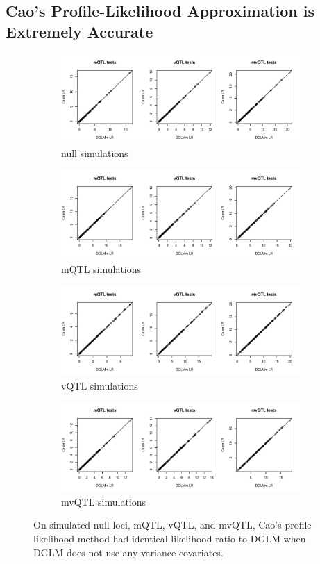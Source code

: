 \FloatBarrier
\clearpage
\subsection{Cao's Profile-Likelihood Approximation is Extremely Accurate}
  \begin{figure}[h!]
    \begin{subfigure}{\linewidth}
        \caption{null simulations}
        \centering
        \includegraphics[width = 0.7\linewidth]{images/Cao_and_DGLM_indistinguishable_null.pdf}
    \end{subfigure}
     \begin{subfigure}{\linewidth}
        \caption{mQTL simulations}
        \centering
        \includegraphics[width = 0.7\linewidth]{images/Cao_and_DGLM_indistinguishable_mqtl.pdf}
    \end{subfigure}
    \begin{subfigure}{\linewidth}
        \caption{vQTL simulations}
        \centering
        \includegraphics[width = 0.7\linewidth]{images/Cao_and_DGLM_indistinguishable_vqtl.pdf}
    \end{subfigure}
    \begin{subfigure}{\linewidth}
        \caption{mvQTL simulations}
        \centering
        \includegraphics[width = 0.7\linewidth]{images/Cao_and_DGLM_indistinguishable_mvqtl.pdf}
    \end{subfigure}
    \caption{On simulated null loci, mQTL, vQTL, and mvQTL, Cao's profile likelihood method had identical likelihood ratio to DGLM when DGLM does not use any variance covariates.}
    \label{fig:cao_profile_accurate}
  \end{figure}


